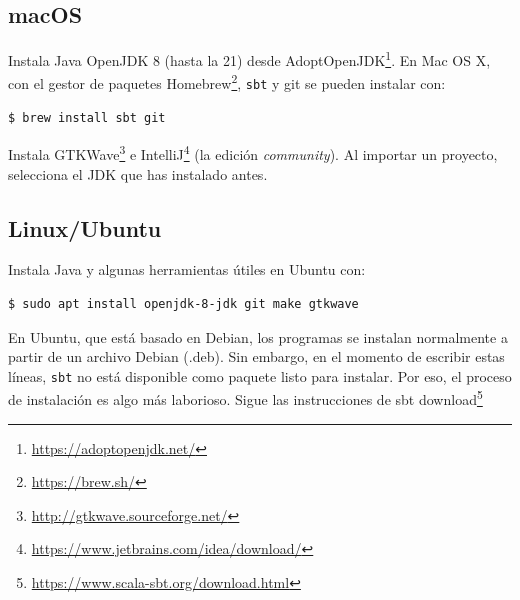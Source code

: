 \documentclass[%
    10pt,
    headinclude, footinclude=false,
    openright, %
    notitlepage,
    cleardoublepage=empty,
    headsepline,
    numbers=noenddot,
    bibliography=totoc, index=totoc,
    ]{scrbook}
\newcommand{\code}[1]{{\lstinline[basicstyle=\small\ttfamily]{#1}}}
\newcommand{\myref}[2]{\href{#1}{#2}}
\renewcommand{\myref}[2]{{#2}{\footnote{\url{#1}}}}
\begin{document}
\subsection{macOS}


Instala Java OpenJDK 8 (hasta la 21) desde \myref{https://adoptopenjdk.net/}{AdoptOpenJDK}.
En Mac OS X, con el gestor de paquetes \myref{https://brew.sh/}{Homebrew},
\code{sbt} y git se pueden instalar con:

\begin{verbatim}
$ brew install sbt git
\end{verbatim}


Instala \myref{http://gtkwave.sourceforge.net/}{GTKWave} e
\myref{https://www.jetbrains.com/idea/download/}{IntelliJ} (la edición \emph{community}).
Al importar un proyecto, selecciona el JDK que has instalado antes.

\subsection{Linux/Ubuntu}


Instala Java y algunas herramientas útiles en Ubuntu con:
\begin{verbatim}
$ sudo apt install openjdk-8-jdk git make gtkwave
\end{verbatim}


En Ubuntu, que está basado en Debian, los programas se instalan normalmente a partir de un
archivo Debian (.deb). Sin embargo, en el momento de escribir estas líneas, \code{sbt} no
está disponible como paquete listo para instalar. Por eso, el proceso de instalación
es algo más laborioso.
Sigue las instrucciones de \myref{https://www.scala-sbt.org/download.html}{sbt download}
\end{document}
